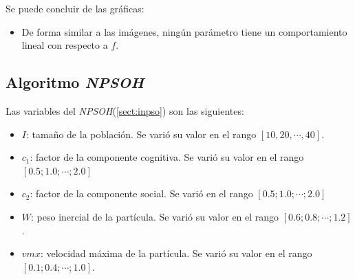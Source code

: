 \begin{figure}[H]
  \centering
  \label{fig:f_gacsv2}
\end{figure}

	Se puede concluir de las gráficas:
\begin{itemize}
	\item De forma similar a las imágenes, ningún parámetro tiene
un comportamiento lineal con respecto a $f$.
\end{itemize}

\subsection{Algoritmo \emph{NPSOH}}\label{sect:inpso-rv}

    Las variables del \emph{NPSOH}(\ref{sect:inpso}) son las siguientes:
\begin{itemize}
    \item $I$: tamaño de la población. Se varió su valor en el rango
$[10, 20, \cdots, 40]$.
    \item $c_1$: factor de la componente cognitiva. Se varió su valor en el
rango $[0.5; 1.0; \cdots; 2.0]$
    \item $c_2$: factor de la componente social. Se varió en el rango
$[0.5; 1.0; \cdots; 2.0]$
    \item $W$: peso inercial de la partícula. Se varió su valor en el rango
$[0.6; 0.8; \cdots; 1.2]$.
    \item $vmx$: velocidad máxima de la partícula. Se varió su valor en el rango
$[0.1; 0.4; \cdots; 1.0]$.
\end{itemize}

